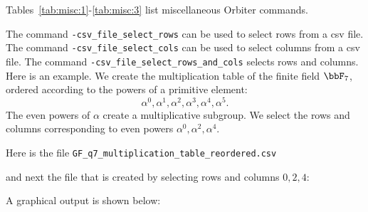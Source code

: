 Tables~\ref{tab:misc:1}-\ref{tab:misc:3} list miscellaneous Orbiter commands.


The command \verb'-csv_file_select_rows' can be used to select rows from a csv file. 
The command \verb'-csv_file_select_cols' can be used to select columns from a csv file. 
The command \verb'-csv_file_select_rows_and_cols' selects rows and columns. 
Here is an example. 
We create the multiplication table of the finite field $\bbF_7$, 
ordered according to the powers of a primitive element:
$$
\alpha^0, \alpha^1, \alpha^2, \alpha^3, \alpha^4, \alpha^5.
$$
The even powers of $\alpha$ create a multiplicative subgroup. 
We select the rows and columns 
corresponding to even powers $\alpha^0, \alpha^2, \alpha^4.$


Here is the file \verb'GF_q7_multiplication_table_reordered.csv'


and next the file that is created by selecting rows and columns $0,2,4$:


A graphical output is shown below:


\bigskip

